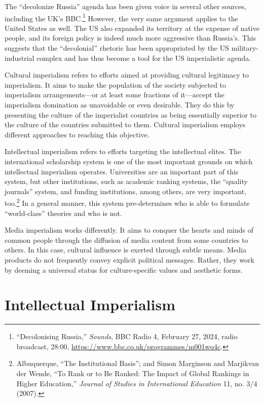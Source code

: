 \documentclass{tufte-handout}
\begin{document}
The ``decolonize Russia'' agenda has been given voice in several other
sources, including the UK's BBC.\footnote{``Decolonising Russia,''
  \emph{Sounds}, BBC Radio 4, February 27, 2024, radio broadcast, 28:00,
  \url{https://www.bbc.co.uk/programmes/m001wq4c}.} However, the very same
argument applies to the United States as well. The US also expanded its
territory at the expense of native people, and its foreign policy is
indeed much more aggressive than Russia's. This suggests that the
``decolonial'' rhetoric has been appropriated by the US
military-industrial complex and has thus become a tool for the US
imperialistic agenda.

Cultural imperialism refers to efforts aimed at providing cultural
legitimacy to imperialism. It aims to make the population of the society
subjected to imperialism arrangements---or at least some fractions of
it---accept the imperialism domination as unavoidable or even desirable.
They do this by presenting the culture of the imperialist countries as
being essentially superior to the culture of the countries submitted to
them. Cultural imperialism employs different approaches to reaching this
objective.

Intellectual imperialism refers to efforts targeting the intellectual
elites. The international scholarship system is one of the most
important grounds on which intellectual imperialism operates.
Universities are an important part of this system, but other
institutions, such as academic ranking systems, the ``quality journals''
system, and funding institutions, among others, are very important,
too.\footnote{Albuquerque, ``The Institutional Basis''; and Simon
  Marginson and Marjikvan der Wende, ``To Rank or to Be Ranked: The
  Impact of Global Rankings in Higher Education,'' \emph{Journal of
  Studies in International Education} 11, no. 3/4 (2007).} In a general
manner, this system pre-determines who is able to formulate
``world-class'' theories and who is not.

\newpage Media imperialism works differently. It aims to conquer the hearts and
minds of common people through the diffusion of media content from some
countries to others. In this case, cultural influence is exerted through
subtle means. Media products do not frequently convey explicit political
messages. Rather, they work by deeming a universal status for
culture-specific values and aesthetic forms.

\hypertarget{intellectual-imperialism}{%
\section{Intellectual Imperialism}\label{intellectual-imperialism}}
\end{document}
